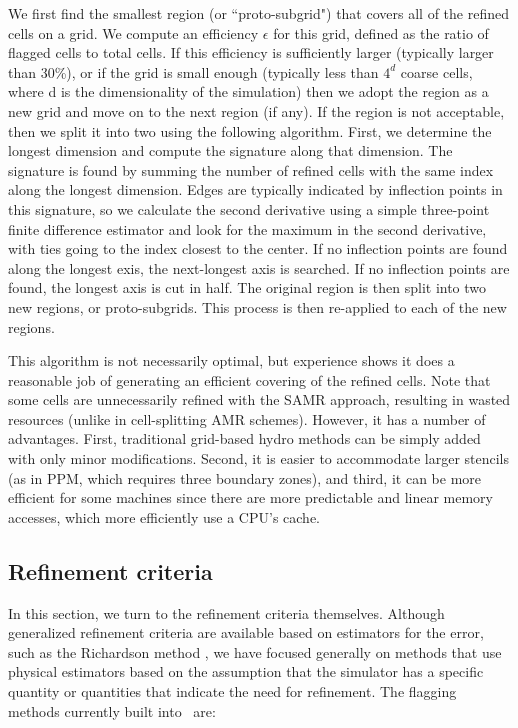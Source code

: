 We first find the smallest region (or ``proto-subgrid") that covers all of the refined cells on a grid.  We compute an efficiency $\epsilon$ for this grid, defined as the ratio of flagged cells to total cells.  If this efficiency is sufficiently larger (typically larger than 30\%), or if the grid is small enough (typically less than $4^d$ coarse cells, where d is the dimensionality of the simulation) then we adopt the region as a new grid and move on to the next region (if any).  If the region is not acceptable, then we split it into two using the following algorithm.  First, we determine the longest dimension and compute the signature along that dimension.  The signature is found by summing the number of refined cells with the same index along the longest dimension.  Edges are typically indicated by inflection points in this signature, so we calculate the second derivative using a simple three-point finite difference estimator and look for the maximum in the second derivative, with ties going to the index closest to the center.  If no inflection points are found along the longest exis, the next-longest axis is searched.  If no inflection points are found, the longest axis is cut in half.  The original region is then split into two new regions, or proto-subgrids.  This process is then re-applied to each of the new regions.

This algorithm is not necessarily optimal, but experience shows it does a reasonable job of generating an efficient covering of the refined cells.  Note that some cells are unnecessarily refined with the SAMR approach, resulting in wasted resources (unlike in cell-splitting AMR schemes).  However, it has a number of advantages.  First, traditional grid-based hydro methods can be simply added with only minor modifications.  Second, it is easier to accommodate larger stencils (as in PPM, which requires three boundary zones), and third, it can be more efficient for some machines since there are more predictable and linear memory accesses, which more efficiently use a CPU's cache.


\subsection{Refinement criteria}
\label{sec:refinement_criteria}

In this section, we turn to the refinement criteria themselves.  Although generalized refinement criteria are available based on estimators for the error, such as the Richardson method , we have focused generally on methods that use physical estimators based on the assumption that the simulator has a specific quantity or quantities that indicate the need for refinement.  The flagging methods currently built into \enzo\ are:

